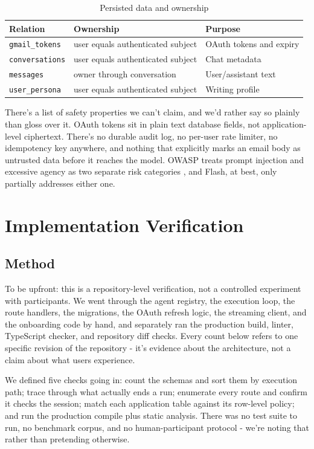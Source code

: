 \documentclass[conference]{IEEEtran}
\begin{document}
\begin{table}[t]
\centering
\caption{Persisted data and ownership}
\scriptsize
\begin{tabularx}{\columnwidth}{@{}p{}YY@{}}
\toprule
\textbf{Relation} & \textbf{Ownership} & \textbf{Purpose} \\
\midrule
\texttt{gmail\_tokens} & user equals authenticated subject & OAuth tokens and expiry \\
\texttt{conversations} & user equals authenticated subject & Chat metadata \\
\texttt{messages} & owner through conversation & User/assistant text \\
\texttt{user\_persona} & user equals authenticated subject & Writing profile \\
\bottomrule
\end{tabularx}
\end{table}

There's a list of safety properties we can't claim, and we'd rather say so plainly than gloss over it. OAuth tokens sit in plain text database fields, not application-level ciphertext. There's no durable audit log, no per-user rate limiter, no idempotency key anywhere, and nothing that explicitly marks an email body as untrusted data before it reaches the model. OWASP treats prompt injection and excessive agency as two separate risk categories \cite{owasp}, and Flash, at best, only partially addresses either one.

\section{Implementation Verification}

\subsection{Method}

To be upfront: this is a repository-level verification, not a controlled experiment with participants. We went through the agent registry, the execution loop, the route handlers, the migrations, the OAuth refresh logic, the streaming client, and the onboarding code by hand, and separately ran the production build, linter, TypeScript checker, and repository diff checks. Every count below refers to one specific revision of the repository - it's evidence about the architecture, not a claim about what users experience.

We defined five checks going in: count the schemas and sort them by execution path; trace through what actually ends a run; enumerate every route and confirm it checks the session; match each application table against its row-level policy; and run the production compile plus static analysis. There was no test suite to run, no benchmark corpus, and no human-participant protocol - we're noting that rather than pretending otherwise.
\end{document}
